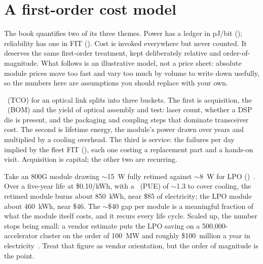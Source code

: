 
\section{A first-order cost model}
\label{sec:cost-model}

The book quantifies two of its three themes. Power has a ledger in pJ/bit
(); reliability has one in FIT (). Cost is
invoked everywhere but never counted. It deserves the same first-order treatment,
kept deliberately relative and order-of-magnitude. What follows is an illustrative
model, not a price sheet: absolute module prices move too fast and vary too much by
volume to write down usefully, so the numbers here are assumptions you should
replace with your own.

\ (TCO) for an optical link splits into three buckets.
The first is acquisition, the \ (BOM) and the yield of
optical assembly and test: laser count, whether a DSP die is present, and the
packaging and coupling steps that dominate transceiver cost. The second is lifetime
energy, the module's power drawn over years and multiplied by a cooling overhead.
The third is service: the failures per day implied by the fleet FIT
(), each one costing a replacement part and a hands-on visit.
Acquisition is capital; the other two are recurring.

 Take an 800G module drawing
$\sim$15~W fully retimed against $\sim$8~W for LPO ()~\cite{lpo}.
Over a five-year life at \$0.10/kWh, with a \ (PUE)
of $\sim$1.3 to cover cooling, the retimed module burns about 850~kWh, near \$85 of
electricity; the LPO module about 460~kWh, near \$46. The $\sim$\$40 gap per module
is a meaningful fraction of what the module itself costs, and it recurs every life
cycle. Scaled up, the number stops being small: a vendor estimate puts the LPO
saving on a 500{,}000-accelerator cluster on the order of 100~MW and roughly
\$100~million a year in electricity~. Treat that figure as
vendor orientation, but the order of magnitude is the point.

